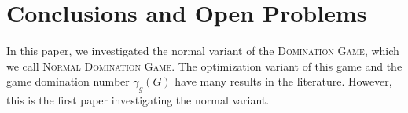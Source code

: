\documentclass[12pt]{article}
\begin{document}

\section{Conclusions and Open Problems}

In this paper, we investigated the normal variant of the \textsc{Domination Game}, which we call \textsc{Normal Domination Game}. 
The optimization variant of this game and the game domination number $\gamma_g(G)$ have many results in the literature. However, this is the first paper investigating the normal variant.
\end{document}
